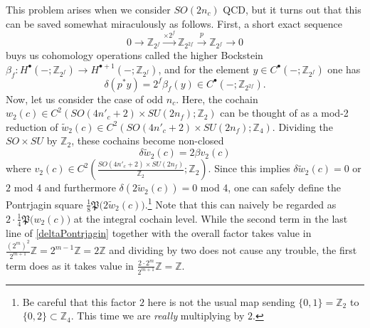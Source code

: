 \documentclass[12pt]{article}
\numberwithin{equation}{section}
\def\bZ{\mathbb{Z}}
\def\fP{\mathfrak{P}}
\begin{document}
This problem arises when we consider $SO(2n_c)$ QCD,
but it turns out that this can be saved somewhat miraculously as follows.
First, a short exact sequence
\begin{equation*}
	0
	\to
	\bZ_{2^f}
	\overset{\times 2^{f}}{\longrightarrow}
	\bZ_{2^{2f}}
	\overset{p}{\longrightarrow}
	\bZ_{2^f}
	\to
	0
\end{equation*}
buys us cohomology operations called the higher Bockstein $\beta_f: H^{\bullet}(-;\bZ_{2^f}) \to H^{\bullet+1}(-;\bZ_{2^f})$,
and for the element $y \in C^{\bullet}(-;\bZ_{2^f})$ one has
\begin{equation*}
	\delta (p^\ast y)
	=
	2^f \beta_f (y) \in C^\bullet(-;\bZ_{2^{2f}}).
\end{equation*}
Now, let us consider the case of odd $n_c$.
Here, the cochain $w_2(c) \in C^2(SO(4n'_c+2)\times SU(2n_f); \bZ_2)$
can be thought of as a mod-2 reduction of $\widetilde w_2(c)\in C^2(SO(4n'_c+2)\times SU(2n_f); \bZ_4)$.
Dividing the $SO\times SU$ by $\bZ_2$, these cochains become non-closed
\begin{equation*}
	\delta \widetilde w_2(c) = 2 \beta v_2(c)
\end{equation*}
where $v_2(c)\in C^2\left(\tfrac{SO(4n'_c+2)\times SU(2n_f)}{\bZ_2}; \bZ_2\right)$.
Since this implies $\delta \widetilde w_2(c) = 0$ or $2$ mod 4
and furthermore $\delta (2\widetilde w_2(c)) = 0$ mod 4,
one can safely define the Pontrjagin square $\tfrac{1}{8}\fP\big(2\widetilde w_2(c)\big)$.\footnote{
	Be careful that this factor $2$ here is not the usual map sending $\{0,1\}=\bZ_2$ to $\{0,2\}\subset \bZ_4$.
	This time we are \textit{really} multiplying by $2$.
}
Note that this can naively be regarded as $2\cdot \tfrac{1}{4}\fP\big(w_2(c)\big)$ at the integral cochain level.
While the second term in the last line of \eqref{deltaPontrjagin} together with the overall factor takes value in
$\tfrac{(2^m)^2}{2^{m+1}}\bZ = 2^{m-1}\bZ = 2\bZ$ and dividing by two does not cause any trouble,
the first term does as it takes value in $\tfrac{2\cdot 2^m}{2^{m+1}}\bZ = \bZ$.
\end{document}
